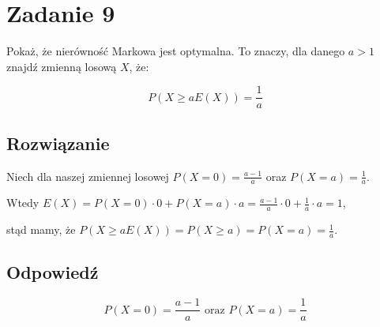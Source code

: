 \section{Zadanie 9}
Pokaż, że nierówność Markowa jest optymalna. To znaczy, dla danego \(a > 1\) znajdź zmienną losową \(X\), że:

\[P(X\geqslant aE(X)) = \frac{1}{a}\]

\subsection*{Rozwiązanie}
Niech dla naszej zmiennej losowej \(P(X = 0) = \frac{a-1}{a}\) oraz \(P(X = a) = \frac{1}{a}\).

Wtedy \(E(X) = P(X = 0)\cdot 0 + P(X = a)\cdot a = \frac{a-1}{a}\cdot 0 + \frac{1}{a}\cdot a = 1\),

stąd mamy, że \(P(X\geqslant aE(X)) = P(X\geqslant a) = P(X = a) = \frac{1}{a}\).

\subsection*{Odpowiedź}
\[
	\boxed{\text{\(P(X = 0) = \frac{a-1}{a}\) oraz \(P(X = a) = \frac{1}{a}\)}}
\]
